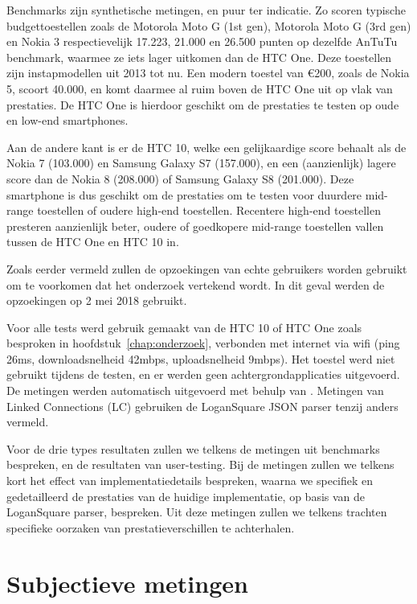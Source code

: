 Benchmarks zijn synthetische metingen, en puur ter indicatie. Zo scoren typische budgettoestellen zoals de Motorola Moto G (1st gen), Motorola Moto G (3rd gen) en Nokia 3 respectievelijk 17.223, 21.000 en 26.500 punten op dezelfde AnTuTu benchmark, waarmee ze iets lager uitkomen dan de HTC One. Deze toestellen zijn instapmodellen uit 2013 tot nu. Een modern toestel van €200, zoals de Nokia 5, scoort 40.000, en komt daarmee al ruim boven de HTC One uit op vlak van prestaties. De HTC One is hierdoor geschikt om de prestaties te testen op oude en low-end smartphones.

Aan de andere kant is er de HTC 10, welke een gelijkaardige score behaalt als de Nokia 7 (103.000) en Samsung Galaxy S7 (157.000), en een (aanzienlijk) lagere score dan de Nokia 8 (208.000) of Samsung Galaxy S8 (201.000). Deze smartphone is dus geschikt om de prestaties om te testen voor duurdere mid-range toestellen of oudere high-end toestellen. Recentere high-end toestellen presteren aanzienlijk beter, oudere of goedkopere mid-range toestellen vallen tussen de HTC One en HTC 10 in. 

Zoals eerder vermeld zullen de opzoekingen van echte gebruikers worden gebruikt om te voorkomen dat het onderzoek vertekend wordt. In dit geval werden de opzoekingen op 2 mei 2018 gebruikt.

Voor alle tests werd gebruik gemaakt van de HTC 10 of HTC One zoals besproken in hoofdstuk~\ref{chap:onderzoek}, verbonden met internet via wifi (ping 26ms, downloadsnelheid 42mbps, uploadsnelheid 9mbps). Het toestel werd niet gebruikt tijdens de testen, en er werden geen achtergrondapplicaties uitgevoerd. De metingen werden automatisch uitgevoerd met behulp van . Metingen van Linked Connections (LC) gebruiken de LoganSquare JSON parser tenzij anders vermeld.

Voor de drie types resultaten zullen we telkens de metingen uit benchmarks bespreken, en de resultaten van user-testing. Bij de metingen zullen we telkens kort het effect van implementatiedetails bespreken, waarna we specifiek en gedetailleerd de prestaties van de huidige implementatie, op basis van de LoganSquare parser, bespreken. Uit deze metingen zullen we telkens trachten specifieke oorzaken van prestatieverschillen te achterhalen.

\section{Subjectieve metingen}

